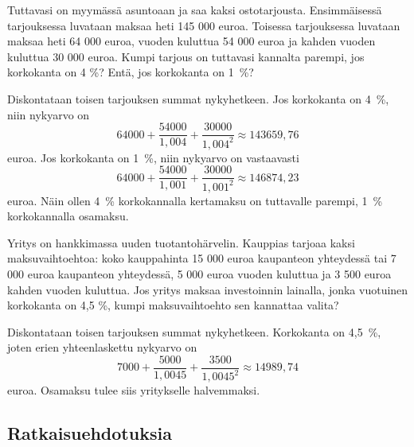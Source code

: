 \documentclass[a4paper,10pt]{article}\usepackage[]{graphicx}\usepackage[]{color}
\begin{document}
\begin{question} Tuttavasi on myymässä asuntoaan ja saa kaksi ostotarjousta. Ensimmäisessä tarjouksessa luvataan maksaa heti 145 000 euroa.
Toisessa tarjouksessa luvataan maksaa heti 64 000 euroa, vuoden kuluttua 54 000 euroa ja kahden vuoden kuluttua 30 000 euroa.
Kumpi tarjous on tuttavasi kannalta parempi, jos korkokanta on 4 \%? Entä, jos korkokanta on 1~\%?
\end{question}\begin{solution}
    Diskontataan toisen tarjouksen summat nykyhetkeen. Jos korkokanta on 4~\%, niin nykyarvo on
    \[
        64000 + \frac{54000}{1,004} + \frac{30000}{1,004^2} \approx 143659,76
    \] euroa.
    Jos korkokanta on 1~\%, niin nykyarvo on vastaavasti
    \[
        64000 + \frac{54000}{1,001} + \frac{30000}{1,001^2} \approx 146874,23
    \] euroa.
    Näin ollen 4~\% korkokannalla kertamaksu on tuttavalle parempi, 1~\% korkokannalla osamaksu.
\end{solution}

\begin{question} Yritys on hankkimassa uuden tuotantohärvelin. Kauppias tarjoaa kaksi maksuvaihtoehtoa:
koko kauppahinta 15 000 euroa kaupanteon yhteydessä tai 7 000 euroa kaupanteon yhteydessä,
5 000 euroa vuoden kuluttua ja 3 500 euroa kahden vuoden kuluttua. Jos yritys maksaa investoinnin lainalla,
jonka vuotuinen korkokanta on 4{,}5 \%, kumpi maksuvaihtoehto sen kannattaa valita?
\end{question}\begin{solution}
    Diskontataan toisen tarjouksen summat nykyhetkeen. Korkokanta on 4,5~\%, joten erien yhteenlaskettu nykyarvo on
    \[
        7000 + \frac{5000}{1,0045} + \frac{3500}{1,0045^2} \approx 14989,74
    \]
    euroa. Osamaksu tulee siis yritykselle halvemmaksi.
\end{solution}

\subsection*{Ratkaisuehdotuksia}
\printsolutions
\end{document}
